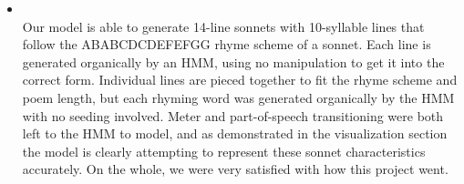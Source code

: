 \begin{itemize}
    \item {} \\

    Our model is able to generate 14-line sonnets with 10-syllable lines that
    follow the ABABCDCDEFEFGG rhyme scheme of a sonnet. Each line is generated
    organically by an HMM, using no manipulation to get it into the correct
    form. Individual lines are pieced together to fit the rhyme scheme and
    poem length, but each rhyming word was generated organically by the HMM
    with no seeding involved. Meter and part-of-speech transitioning were
    both left to the HMM to model, and as demonstrated in the visualization
    section the model is clearly attempting to represent these sonnet
    characteristics accurately. On the whole, we were very satisfied with
    how this project went.
\end{itemize}



